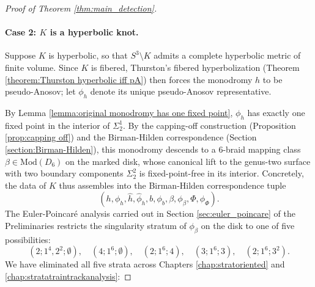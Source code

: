 \begin{proof}[Proof of Theorem \ref{thm:main_detection}]
\paragraph{Case 2: $K$ is a hyperbolic knot.}
Suppose $K$ is hyperbolic, so that $S^3 \setminus K$ admits a complete hyperbolic metric of finite volume. Since $K$ is fibered, Thurston's fibered hyperbolization (Theorem \ref{theorem:Thurston hyperbolic iff pA}) then forces the monodromy $h$ to be pseudo-Anosov; let $\phi_h$ denote its unique pseudo-Anosov representative.

By Lemma \ref{lemma:original monodromy has one fixed point}, $\phi_h$ has exactly one fixed point in the interior of $\Sigma_2^1$. By the capping-off construction (Proposition \ref{prop:capping off}) and the Birman-Hilden correspondence (Section \ref{section:Birman-Hilden}), this monodromy descends to a 6-braid mapping class $\beta \in \mathrm{Mod}(D_6)$ on the marked disk, whose canonical lift to the genus-two surface with two boundary components $\Sigma_2^2$ is fixed-point-free in its interior. Concretely, the data of $K$ thus assembles into the Birman-Hilden correspondence tuple
\[
(h, \phi_h, \hat{h}, \hat{\phi}_h, b, \phi_b, \beta, \phi_\beta, \Phi, \phi_\Phi).
\]
The Euler-Poincar\'{e} analysis carried out in Section \ref{sec:euler_poincare} of the Preliminaries restricts the singularity stratum of $\phi_\beta$ on the disk to one of five possibilities:
\[
(2; 1^4, 2^2; \emptyset),\quad (4; 1^6; \emptyset),\quad (2; 1^6; 4),\quad (3; 1^6; 3),\quad (2; 1^6; 3^2).
\]
We have eliminated all five strata across Chapters \ref{chap:stratoriented} and \ref{chap:stratatraintrackanalysis}:


\end{proof}
